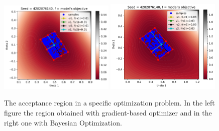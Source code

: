 \documentclass[article, shortnames]{jss}
\begin{document}
\begin{figure}[ht]
    \begin{center}
        \includegraphics[width=0.49\textwidth]{./Figures/chapter4/ma2_region_1.pdf}
        \includegraphics[width=0.49\textwidth]{./Figures/chapter4/ma2_region_1_bo.pdf}
    \end{center}
  \caption[The acceptance region of a specific deterministic simulator.]{The acceptance region in a specific optimization problem. In the left figure the region obtained with gradient-based optimizer and in the right one with Bayesian Optimization.}
  \label{fig:ma2_5}
\end{figure}
\end{document}
